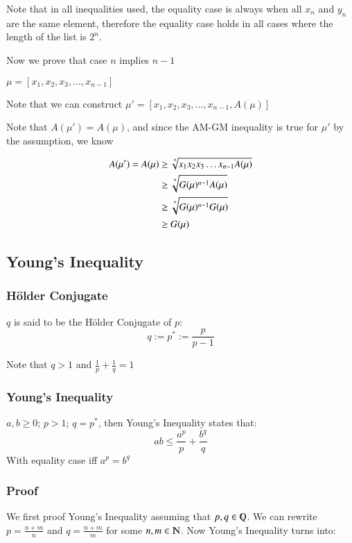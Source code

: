 \documentclass [12 pt, twoside] {book}
\newcommand\+{\text{ }}
\begin{document}
Note that in all inequalities used, the equality case is always when all $x_n$
and $y_n$ are the same element, therefore the equality case holds in all cases
where the length of the list is $2^n$.

Now we prove that case $n$ implies $n-1$

$\mu = [x_1, x_2, x_3, \dots, x_{n - 1}]$

Note that we can construct $\mu' = [x_1, x_2, x_3, \dots, x_{n - 1}, A(\mu)]$

Note that $A(\mu') = A(\mu)$, and since the AM-GM inequality is true for $\mu'$
by the assumption, we know

\begin{align*}
    A(\mu') = A(\mu) &\geq \sqrt[\uproot{2} n]{x_1x_2x_3\dots x_{n - 1}A(\mu)}\\
                     &\geq \sqrt[\uproot{2} n]{G(\mu)^{n-1}A(\mu)}\\
                     &\geq \sqrt[\uproot{2} n]{G(\mu)^{n-1}G(\mu)}\\
                     &\geq G(\mu)
\end{align*}

\subsection{Young's Inequality}
\subsubsection{H\"{o}lder Conjugate}
$q$ is said to be the H\"{o}lder Conjugate of $p$:
$$q := p^* := \frac{p}{p - 1}$$

Note that $q > 1$ and $\frac{1}{p} + \frac{1}{q} = 1$

\subsubsection{Young's Inequality}
$a, b \geq 0$; $p > 1$; $q = p^*$, then Young's Inequality states that:
$$ab \leq \frac{a^p}{p} + \frac{b^q}{q}$$
With equality case iff $a^p = b^q$

\subsubsection{Proof}
We first proof Young's Inequality assuming that $p, q \in \varmathbb{Q}$.
We can rewrite $p = \frac{n + m}{n}$ and $q = \frac{n + m}{m}$ for some $n, m
\in \varmathbb{N}$. Now Young's Inequality turns into:
\end{document}
